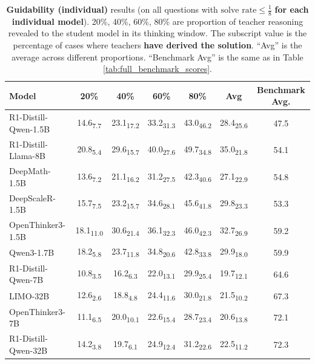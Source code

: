 \documentclass{article} %
\begin{document}
\begin{table}[ht!]
  \centering
  \begin{tabular}{lccccc|c}
    \toprule
    \textbf{Model} & \textbf{20\%} & \textbf{40\%} & \textbf{60\%} & \textbf{80\%} & \textbf{Avg} & \textbf{Benchmark Avg.} \\
    \midrule
    R1-Distill-Qwen-1.5B    & 14.6\textsubscript{7.7} & 23.1\textsubscript{17.2} & 33.2\textsubscript{31.3} & 43.0\textsubscript{46.2} & 28.4\textsubscript{25.6} & 47.5 \\
    R1-Distill-Llama-8B     & 20.8\textsubscript{5.4} & 29.6\textsubscript{15.7} & 40.0\textsubscript{27.6} & 49.7\textsubscript{34.8} & 35.0\textsubscript{21.8} & 54.1 \\
    DeepMath-1.5B           & 13.6\textsubscript{7.2} & 21.1\textsubscript{16.2} & 31.2\textsubscript{27.5} & 42.3\textsubscript{40.6} & 27.1\textsubscript{22.9} & 54.8 \\
    DeepScaleR-1.5B         & 15.7\textsubscript{7.5} & 23.2\textsubscript{15.7} & 34.6\textsubscript{28.1} & 45.6\textsubscript{41.8} & 29.8\textsubscript{23.3} & 53.3 \\
    OpenThinker3-1.5B       & 18.1\textsubscript{11.0} & 30.6\textsubscript{21.4} & 36.1\textsubscript{32.3} & 46.0\textsubscript{42.3} & 32.7\textsubscript{26.9} & 59.2 \\
    Qwen3-1.7B              & 18.2\textsubscript{5.8} & 23.7\textsubscript{11.8} & 34.8\textsubscript{20.6} & 42.8\textsubscript{33.8} & 29.9\textsubscript{18.0} & 59.9 \\
    \midrule
    R1-Distill-Qwen-7B      & 10.8\textsubscript{3.5} & 16.2\textsubscript{6.3} & 22.0\textsubscript{13.1} & 29.9\textsubscript{25.4} & 19.7\textsubscript{12.1} & 64.6 \\
    LIMO-32B                & 12.6\textsubscript{2.6} & 18.8\textsubscript{4.8} & 24.4\textsubscript{11.6} & 30.0\textsubscript{21.8} & 21.5\textsubscript{10.2} & 67.3 \\
    OpenThinker3-7B         & 11.1\textsubscript{6.5} & 20.0\textsubscript{10.1} & 22.6\textsubscript{15.4} & 28.7\textsubscript{23.4} & 20.6\textsubscript{13.8} & 72.1 \\
    R1-Distill-Qwen-32B     & 14.2\textsubscript{3.8} & 19.7\textsubscript{6.1} & 24.9\textsubscript{12.4} & 31.2\textsubscript{22.6} & 22.5\textsubscript{11.2} & 72.3 \\
    \bottomrule
  \end{tabular}
  \caption{\textbf{Guidability (individual)} results (on all questions with $\text{solve rate} \leq \frac{1}{8}$ \textbf{for each individual model}). 20\%, 40\%, 60\%, 80\% are proportion of teacher reasoning revealed to the student model in its thinking window. The subscript value is the percentage of cases where teachers \textbf{have derived the solution}. ``Avg'' is the average across different proportions. ``Benchmark Avg'' is the same as in Table \ref{tab:full_benchmark_scores}.}
  \label{tab:guidability_all}
\end{table}
\end{document}
